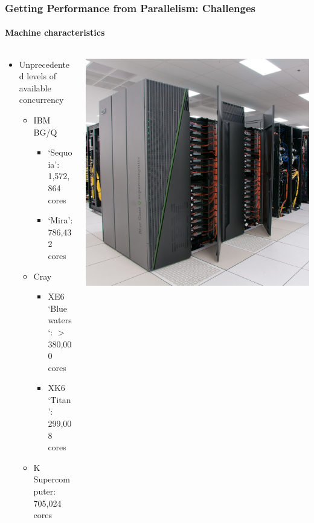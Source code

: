 \begin{frame}[fragile]
\frametitle{Getting Performance from Parallelism: Challenges}
\framesubtitle{Machine characteristics}
  \begin{columns}
    \begin{column}{0.55\textwidth}
      \begin{itemize}
      \item Unprecedented levels of available concurrency
        \begin{itemize}
        \item IBM BG/Q
          \begin{itemize}
          \item `Sequoia': 1,572,864 cores
          \item `Mira': 786,432 cores
          \end{itemize}
        \item Cray
          \begin{itemize}
          \item XE6 `Bluewaters`: $>$ 380,000 cores
          \item XK6 `Titan': 299,008 cores
          \end{itemize}
        \item K Supercomputer: 705,024 cores
        \end{itemize}
      \end{itemize}
    \end{column}
    \begin{column}{0.45\textwidth}
      \includegraphics[width=1\textwidth]{figures/mira.jpg}
    \end{column}
  \end{columns}
\end{frame}


